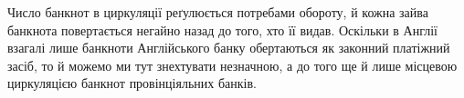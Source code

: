 Число банкнот в циркуляції реґулюється потребами обороту, й кожна
зайва банкнота повертається негайно назад до того, хто її видав. Оскільки в
Англії взагалі лише банкноти Англійського банку обертаються як законний
платіжний засіб, то й можемо ми тут знехтувати незначною, а до того ще й лише
місцевою циркуляцією банкнот провінціяльних банків.
